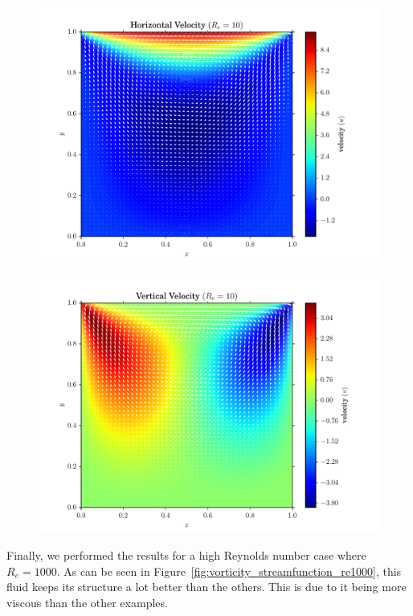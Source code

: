 \documentclass[addpoints]{exam}
\begin{document}
\begin{questions}
\begin{solution}
\begin{figure}[H]
\centering
\begin{minipage}{.45\textwidth}
\centering
\includegraphics[width=\textwidth]{figs/x-velocity_10.pdf}
\label{fig:x_vel_re10}
\end{minipage}
\begin{minipage}{.45\textwidth}
\centering
\includegraphics[width=\textwidth]{figs/y-velocity_10.pdf}
\label{fig:y_vel_re10}
\end{minipage}
\end{figure}


Finally, we performed the results for a high Reynolds number case where $R_{e}=1000$. As can be seen in Figure~\ref{fig:vorticity_streamfunction_re1000}, this fluid keeps its structure a lot better than the others. This is due to it being more viscous than the other examples. 


\end{solution}
\end{questions}
\end{document}
